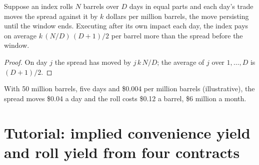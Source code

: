 \begin{proposition}\label{prop:m3:forward-curves-storage-and-convenience-yield:rollcost}
Suppose an index rolls $N$ barrels over $D$ days in equal parts and each day's trade moves the spread
against it by $k$ dollars per million barrels, the move persisting until the window ends. Executing
after its own impact each day, the index pays on average $k\,(N/D)\,(D + 1)/2$ per barrel more than
the spread before the window.
\end{proposition}

\begin{proof}
On day $j$ the spread has moved by $j\,k\,N/D$; the average of $j$ over $1,\dots,D$ is $(D + 1)/2$.
\end{proof}

With 50 million barrels, five days and \$0.004 per million barrels (illustrative), the spread moves
\$0.04 a day and the roll costs \$0.12 a barrel, \$6 million a month.

\section{Tutorial: implied convenience yield and roll yield from four contracts}\label{tut:m3:forward-curves-storage-and-convenience-yield:roll}

